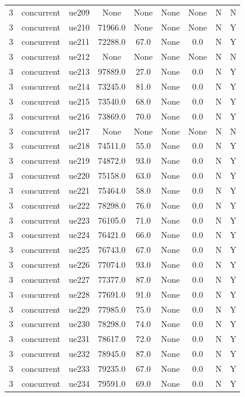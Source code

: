 \begin{table}[ht]
\begin{tabular}{|c|c|c|c|c|c|c|c|c|}
3 & concurrent & ue209 & None & None & None & None & N & N \\
3 & concurrent & ue210 & 71966.0 & None & None & None & N & Y \\
3 & concurrent & ue211 & 72288.0 & 67.0 & None & 0.0 & N & Y \\
3 & concurrent & ue212 & None & None & None & None & N & N \\
3 & concurrent & ue213 & 97889.0 & 27.0 & None & 0.0 & N & Y \\
3 & concurrent & ue214 & 73245.0 & 81.0 & None & 0.0 & N & Y \\
3 & concurrent & ue215 & 73540.0 & 68.0 & None & 0.0 & N & Y \\
3 & concurrent & ue216 & 73869.0 & 70.0 & None & 0.0 & N & Y \\
3 & concurrent & ue217 & None & None & None & None & N & N \\
3 & concurrent & ue218 & 74511.0 & 55.0 & None & 0.0 & N & Y \\
3 & concurrent & ue219 & 74872.0 & 93.0 & None & 0.0 & N & Y \\
3 & concurrent & ue220 & 75158.0 & 63.0 & None & 0.0 & N & Y \\
3 & concurrent & ue221 & 75464.0 & 58.0 & None & 0.0 & N & Y \\
3 & concurrent & ue222 & 78298.0 & 76.0 & None & 0.0 & N & Y \\
3 & concurrent & ue223 & 76105.0 & 71.0 & None & 0.0 & N & Y \\
3 & concurrent & ue224 & 76421.0 & 66.0 & None & 0.0 & N & Y \\
3 & concurrent & ue225 & 76743.0 & 67.0 & None & 0.0 & N & Y \\
3 & concurrent & ue226 & 77074.0 & 93.0 & None & 0.0 & N & Y \\
3 & concurrent & ue227 & 77377.0 & 87.0 & None & 0.0 & N & Y \\
3 & concurrent & ue228 & 77691.0 & 91.0 & None & 0.0 & N & Y \\
3 & concurrent & ue229 & 77985.0 & 75.0 & None & 0.0 & N & Y \\
3 & concurrent & ue230 & 78298.0 & 74.0 & None & 0.0 & N & Y \\
3 & concurrent & ue231 & 78617.0 & 72.0 & None & 0.0 & N & Y \\
3 & concurrent & ue232 & 78945.0 & 87.0 & None & 0.0 & N & Y \\
3 & concurrent & ue233 & 79235.0 & 67.0 & None & 0.0 & N & Y \\
3 & concurrent & ue234 & 79591.0 & 69.0 & None & 0.0 & N & Y \\

\end{tabular}
\end{table}
